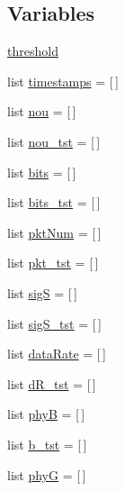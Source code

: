 \subsection*{Variables}
\begin{DoxyCompactItemize}
\item 
\mbox{\hyperlink{namespacetime__series2_a4ad96ae33e961d2a7b9254dcf7705ab1}{threshold}}
\item 
list \mbox{\hyperlink{namespacetime__series2_ac28cc09905078b265b7b43c5a572bc15}{timestamps}} = \mbox{[}$\,$\mbox{]}
\item 
list \mbox{\hyperlink{namespacetime__series2_a97c4b20f0435fa06589a14b07d581ba4}{nou}} = \mbox{[}$\,$\mbox{]}
\item 
list \mbox{\hyperlink{namespacetime__series2_a482617ebda72aedc92277cb1705e039e}{nou\+\_\+tst}} = \mbox{[}$\,$\mbox{]}
\item 
list \mbox{\hyperlink{namespacetime__series2_af73dec23edfc91f6252482247ec3e77a}{bits}} = \mbox{[}$\,$\mbox{]}
\item 
list \mbox{\hyperlink{namespacetime__series2_a2756c0f213fa5f5d2b6cb8fec406006f}{bits\+\_\+tst}} = \mbox{[}$\,$\mbox{]}
\item 
list \mbox{\hyperlink{namespacetime__series2_ab18c2a5668ac375ae8024899566ec9cb}{pkt\+Num}} = \mbox{[}$\,$\mbox{]}
\item 
list \mbox{\hyperlink{namespacetime__series2_a82cbfdb5aaf630b9b2b8a795f8ec71a4}{pkt\+\_\+tst}} = \mbox{[}$\,$\mbox{]}
\item 
list \mbox{\hyperlink{namespacetime__series2_a7f4c741d69814ab642aaeb0d3ba3c6dd}{sigS}} = \mbox{[}$\,$\mbox{]}
\item 
list \mbox{\hyperlink{namespacetime__series2_afe062e2326a14ed5b7bb7084a7ec5be3}{sig\+S\+\_\+tst}} = \mbox{[}$\,$\mbox{]}
\item 
list \mbox{\hyperlink{namespacetime__series2_add60d2a933f0e3175a7c67f66e4aca2d}{data\+Rate}} = \mbox{[}$\,$\mbox{]}
\item 
list \mbox{\hyperlink{namespacetime__series2_a07fb1c09cd6557a4f473012b13676236}{d\+R\+\_\+tst}} = \mbox{[}$\,$\mbox{]}
\item 
list \mbox{\hyperlink{namespacetime__series2_a02d0468d51f7289b53b70785a2297001}{phyB}} = \mbox{[}$\,$\mbox{]}
\item 
list \mbox{\hyperlink{namespacetime__series2_a57a31949fdcc87477da71be37f2a843f}{b\+\_\+tst}} = \mbox{[}$\,$\mbox{]}
\item 
list \mbox{\hyperlink{namespacetime__series2_a33d26c4c9e21812d76047ef5d806a909}{phyG}} = \mbox{[}$\,$\mbox{]}

\end{DoxyCompactItemize}
